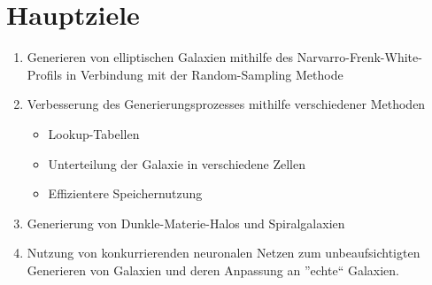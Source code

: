 \section*{Hauptziele}

\begin{enumerate}
\item Generieren von elliptischen Galaxien mithilfe des Narvarro-Frenk-White-Profils in Verbindung mit der Random-Sampling Methode

\item Verbesserung des Generierungsprozesses mithilfe verschiedener Methoden
\begin{itemize}
  \item Lookup-Tabellen
  \item Unterteilung der Galaxie in verschiedene Zellen
  \item Effizientere Speichernutzung
\end{itemize}

\item Generierung von Dunkle-Materie-Halos und Spiralgalaxien

\item Nutzung von konkurrierenden neuronalen Netzen zum unbeaufsichtigten
Generieren von Galaxien und deren Anpassung an ''echte`` Galaxien.
\end{enumerate}
